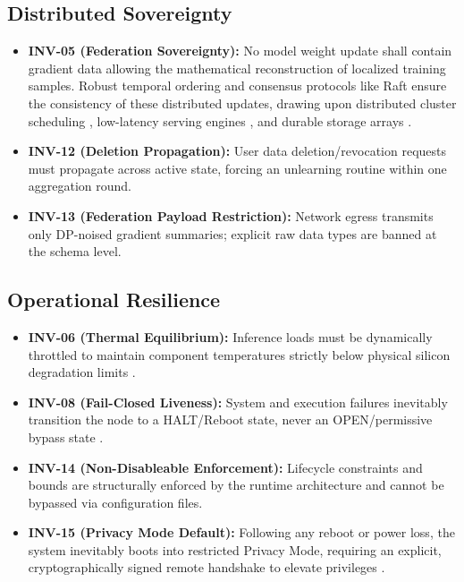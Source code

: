 \documentclass[conference]{IEEEtran}
\begin{document}
\subsection{Distributed Sovereignty}
\begin{itemize}
    \item \textbf{INV-05 (Federation Sovereignty):} No model weight update shall contain gradient data allowing the mathematical reconstruction of localized training samples. Robust temporal ordering \cite{b_lamport} and consensus protocols like Raft \cite{b_ongaro} ensure the consistency of these distributed updates, drawing upon distributed cluster scheduling \cite{b_burns, b_dean}, low-latency serving engines \cite{b_crankshaw}, and durable storage arrays \cite{b_patterson}.
    \item \textbf{INV-12 (Deletion Propagation):} User data deletion/revocation requests must propagate across active state, forcing an unlearning routine within one aggregation round.
    \item \textbf{INV-13 (Federation Payload Restriction):} Network egress transmits only DP-noised gradient summaries; explicit raw data types are banned at the schema level.
\end{itemize}

\subsection{Operational Resilience}
\begin{itemize}
    \item \textbf{INV-06 (Thermal Equilibrium):} Inference loads must be dynamically throttled to maintain component temperatures strictly below physical silicon degradation limits \cite{b_satya, b_edgex}.
    \item \textbf{INV-08 (Fail-Closed Liveness):} System and execution failures inevitably transition the node to a HALT/Reboot state, never an OPEN/permissive bypass state \cite{b_edgex}.
    \item \textbf{INV-14 (Non-Disableable Enforcement):} Lifecycle constraints and bounds are structurally enforced by the runtime architecture and cannot be bypassed via configuration files.
    \item \textbf{INV-15 (Privacy Mode Default):} Following any reboot or power loss, the system inevitably boots into restricted Privacy Mode, requiring an explicit, cryptographically signed remote handshake to elevate privileges \cite{b_edgex}.
\end{itemize}
\end{document}
